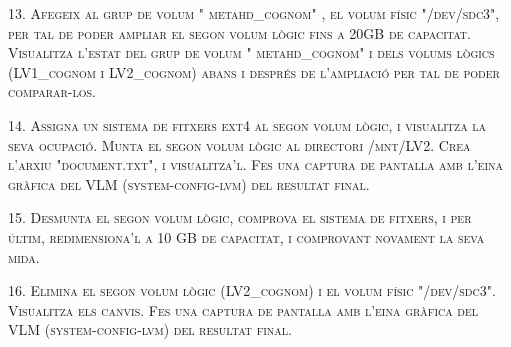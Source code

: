 \documentclass[a4paper,12pt]{article}
\begin{document}
\textsc{13. Afegeix al grup de volum " metahd\_cognom" , el volum físic "/dev/sdc3",  per tal de poder ampliar el segon volum lògic fins a 20GB de capacitat. Visualitza l'estat del grup de volum " metahd\_cognom" i dels volums lògics (LV1\_cognom i LV2\_cognom) abans i després de l'ampliació per tal de poder comparar-los.}

\textsc{14. Assigna un sistema de fitxers ext4 al segon volum lògic, i visualitza la seva ocupació. Munta el segon volum lògic al directori /mnt/LV2. Crea l'arxiu  "document.txt",  i visualitza'l. Fes una captura de pantalla amb l'eina gràfica del VLM (system-config-lvm) del resultat final.}

\textsc{15. Desmunta el segon volum lògic, comprova el sistema de fitxers, i per últim, redimensiona'l  a 10 GB de capacitat, i comprovant novament la seva mida.}

\textsc{16. Elimina el segon volum lògic (LV2\_cognom) i  el volum físic "/dev/sdc3". Visualitza els canvis. Fes una captura de pantalla amb l'eina gràfica del VLM (system-config-lvm) del resultat final.}

\newpage
\end{document}
